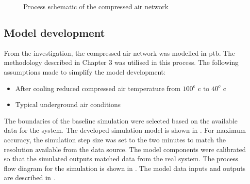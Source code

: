 	\begin{figure}[h!]
		\centering
		\caption{Process schematic of the compressed air network}
		\label{fig: KUS Air layout}
	\end{figure}
\clearpage

\subsection{Model development}
	
From the investigation, the compressed air network was modelled in \gls{ptb}. The methodology described in Chapter 3 was utilised in this process. The following assumptions made to simplify the model development:
\begin{itemize}
	\item After cooling reduced compressed air temperature from $ 100 ^o $ \gls{c} to $ 40 ^o $ \gls{c}
	\item Typical underground air conditions
\end{itemize}
 The boundaries of the baseline simulation were selected based on the available data for the system. The developed simulation model is shown in . For maximum accuracy, the simulation step size was set to the two minutes to match the resolution available from the data source.
The model components were calibrated so that the simulated outputs matched data from the real system. The process flow diagram for the simulation is shown in . The model data inputs and outputs are described in .

